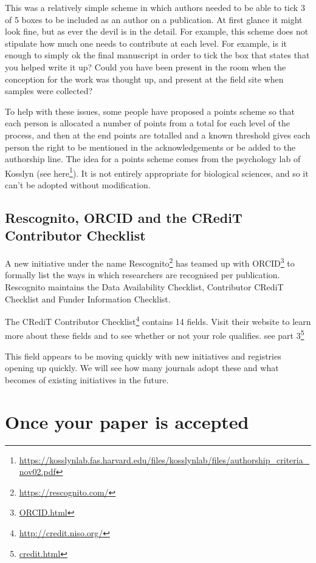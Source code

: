 \documentclass[
]{krantz}
\renewcommand{\href}[2]{#2\footnote{\url{#1}}}
\begin{document}
This was a relatively simple scheme in which authors needed to be able to tick 3 of 5 boxes to be included as an author on a publication. At first glance it might look fine, but as ever the devil is in the detail. For example, this scheme does not stipulate how much one needs to contribute at each level. For example, is it enough to simply ok the final manuscript in order to tick the box that states that you helped write it up? Could you have been present in the room when the conception for the work was thought up, and present at the field site when samples were collected?

To help with these issues, some people have proposed a points scheme so that each person is allocated a number of points from a total for each level of the process, and then at the end points are totalled and a known threshold gives each person the right to be mentioned in the acknowledgements or be added to the authorship line. The idea for a points scheme comes from the psychology lab of Kosslyn (see \href{https://kosslynlab.fas.harvard.edu/files/kosslynlab/files/authorship_criteria_nov02.pdf}{here}). It is not entirely appropriate for biological sciences, and so it can't be adopted without modification.

\hypertarget{rescognito-orcid-and-the-credit-contributor-checklist}{%
\section{Rescognito, ORCID and the CRediT Contributor Checklist}\label{rescognito-orcid-and-the-credit-contributor-checklist}}

A new initiative under the name \href{https://rescognito.com/}{Rescognito} has teamed up with \href{ORCID.html}{ORCID} to formally list the ways in which researchers are recognised per publication. Rescognito maintains the Data Availability Checklist, Contributor CRediT Checklist and Funder Information Checklist.

The \href{http://credit.niso.org/}{CRediT Contributor Checklist} contains 14 fields. Visit their website to learn more about these fields and to see whether or not your role qualifies. \href{credit.html}{see part 3}

This field appears to be moving quickly with new initiatives and registries opening up quickly. We will see how many journals adopt these and what becomes of existing initiatives in the future.

\hypertarget{accepted}{%
\chapter{Once your paper is accepted}\label{accepted}}
\end{document}
